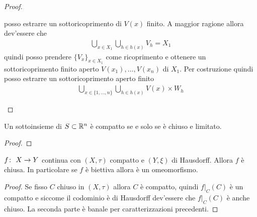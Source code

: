 \begin{proof}
\begin{enumerate}
\begin{equation}
		\end{equation}
		posso estrarre un sottoricoprimento di $V(x)$ finito. A maggior ragione allora dev'essere che 
		\begin{equation}
		\begin{aligned}
		\bigcup_{x \in X_1} \bigcup_{h \in h(x)} V_h = X_1
		\end{aligned}
		\end{equation} 
		quindi posso prendere $\{V_x\}_{x \in X_1}$ come ricoprimento e ottenere un sottoricoprimento finito aperto $V(x_1), \dots, V(x_n)$ di $X_1$.
		Per costruzione quindi posso estrarre un sottoricoprimento aperto finito  
		\begin{equation}
		\begin{aligned}
		\bigcup_{x \in \{1,\dots, n\}} \bigcup_{h \in h(x)} V(x) \times W_h
		\end{aligned}
		\end{equation}
	\end{enumerate}
\end{proof}

\begin{corollary}
	Un sottoinsieme di $S \subset \mathbb{R}^n$ è compatto se e solo se è chiuso e limitato. 
\end{corollary} 
\begin{proof}
\end{proof}

\begin{theorem}
	$f \colon\ X \rightarrow Y$ continua con $(X, \tau)$ compatto e $(Y, \xi)$ di Hausdorff. Allora $f$ è chiusa. In particolare se $f$ è biettiva allora è un omeomorfismo. 
\end{theorem} 
\begin{proof}
	Se fisso $C$ chiuso in $(X,\tau)$ allora $C$ è compatto, quindi $f|_C(C)$ è un compatto e siccome il codominio è di Hausdorff dev'essere che $f|_C(C)$ è anche chiuso. La seconda parte è banale per caratterizzazioni precedenti.
\end{proof}

